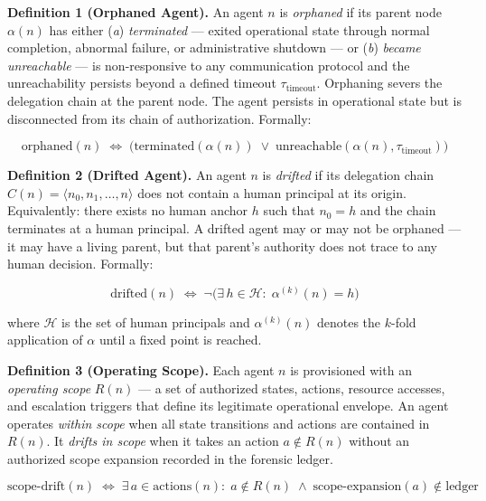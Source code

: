 \medskip
\noindent\textbf{Definition 1 (Orphaned Agent).} An agent $n$ is \emph{orphaned} if its parent node $\alpha(n)$ has either (\emph{a}) \emph{terminated} — exited operational state through normal completion, abnormal failure, or administrative shutdown — or (\emph{b}) \emph{became unreachable} — is non-responsive to any communication protocol and the unreachability persists beyond a defined timeout $\tau_{\text{timeout}}$. Orphaning severs the delegation chain at the parent node. The agent persists in operational state but is disconnected from its chain of authorization. Formally:

\begin{equation}
\text{orphaned}(n) \;\Longleftrightarrow\; \bigl(\text{terminated}(\alpha(n)) \;\lor\; \text{unreachable}(\alpha(n), \tau_{\text{timeout}})\bigr)
\label{eq:drift-orphaned}
\end{equation}

\medskip
\noindent\textbf{Definition 2 (Drifted Agent).} An agent $n$ is \emph{drifted} if its delegation chain $C(n) = \langle n_0, n_1, \ldots, n \rangle$ does not contain a human principal at its origin. Equivalently: there exists no human anchor $h$ such that $n_0 = h$ and the chain terminates at a human principal. A drifted agent may or may not be orphaned — it may have a living parent, but that parent's authority does not trace to any human decision. Formally:

\begin{equation}
\text{drifted}(n) \;\Longleftrightarrow\; \neg\bigl(\exists\, h \in \mathcal{H}:\; \alpha^{(k)}(n) = h\bigr)
\label{eq:drift-drifted}
\end{equation}

where $\mathcal{H}$ is the set of human principals and $\alpha^{(k)}(n)$ denotes the $k$-fold application of $\alpha$ until a fixed point is reached.

\medskip
\noindent\textbf{Definition 3 (Operating Scope).} Each agent $n$ is provisioned with an \emph{operating scope} $R(n)$ — a set of authorized states, actions, resource accesses, and escalation triggers that define its legitimate operational envelope. An agent operates \emph{within scope} when all state transitions and actions are contained in $R(n)$. It \emph{drifts in scope} when it takes an action $a \notin R(n)$ without an authorized scope expansion recorded in the forensic ledger.

\begin{equation}
\text{scope-drift}(n) \;\Longleftrightarrow\; \exists\, a \in \text{actions}(n):\; a \notin R(n) \;\land\; \text{scope-expansion}(a) \notin \text{ledger}
\label{eq:drift-scope}
\end{equation}


